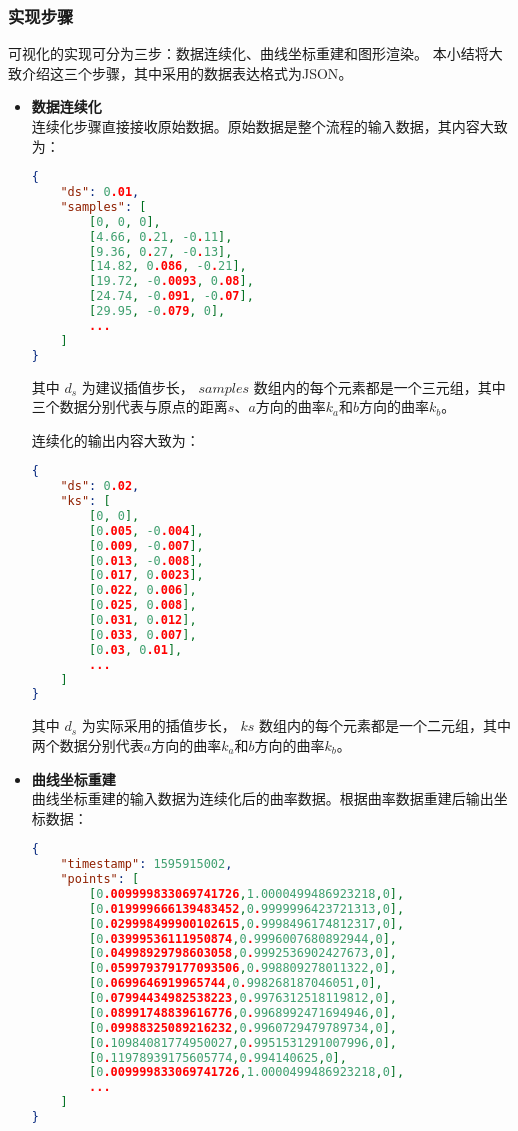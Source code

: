 \subsubsection{实现步骤}

可视化的实现可分为三步：数据连续化、曲线坐标重建和图形渲染。
本小结将大致介绍这三个步骤，其中采用的数据表达格式为JSON\cite{rfc7159}。

\begin{itemize}

\item \textbf{数据连续化} \\
连续化步骤直接接收原始数据。原始数据是整个流程的输入数据，其内容大致为：

\begin{lstlisting}[language=json,firstnumber=1]
{
    "ds": 0.01,
    "samples": [
        [0, 0, 0],
        [4.66, 0.21, -0.11],
        [9.36, 0.27, -0.13],
        [14.82, 0.086, -0.21],
        [19.72, -0.0093, 0.08],
        [24.74, -0.091, -0.07],
        [29.95, -0.079, 0],
        ...
    ]
}
\end{lstlisting}

其中 $d_s$ 为建议插值步长，
$samples$ 数组内的每个元素都是一个三元组，其中三个数据分别代表与原点的距离$s$、$a$方向的曲率$k_a$和$b$方向的曲率$k_b$。

连续化的输出内容大致为：

\begin{lstlisting}[language=json,firstnumber=1]
{
    "ds": 0.02,
    "ks": [
        [0, 0],
        [0.005, -0.004],
        [0.009, -0.007],
        [0.013, -0.008],
        [0.017, 0.0023],
        [0.022, 0.006],
        [0.025, 0.008],
        [0.031, 0.012],
        [0.033, 0.007],
        [0.03, 0.01],
        ...
    ]
}
\end{lstlisting}

其中 $d_s$ 为实际采用的插值步长，
$ks$ 数组内的每个元素都是一个二元组，其中两个数据分别代表$a$方向的曲率$k_a$和$b$方向的曲率$k_b$。

\item \textbf{曲线坐标重建} \\
曲线坐标重建的输入数据为连续化后的曲率数据。根据曲率数据重建后输出坐标数据：

\begin{lstlisting}[language=json,firstnumber=1]
{
    "timestamp": 1595915002,
    "points": [
        [0.009999833069741726,1.0000499486923218,0],
        [0.019999666139483452,0.9999996423721313,0],
        [0.029998499900102615,0.9998496174812317,0],
        [0.03999536111950874,0.9996007680892944,0],
        [0.04998929798603058,0.9992536902427673,0],
        [0.059979379177093506,0.998809278011322,0],
        [0.0699646919965744,0.998268187046051,0],
        [0.07994434982538223,0.9976312518119812,0],
        [0.08991748839616776,0.9968992471694946,0],
        [0.09988325089216232,0.9960729479789734,0],
        [0.10984081774950027,0.9951531291007996,0],
        [0.11978939175605774,0.994140625,0],
        [0.009999833069741726,1.0000499486923218,0],
        ...
    ]
}
\end{lstlisting}


\end{itemize}
